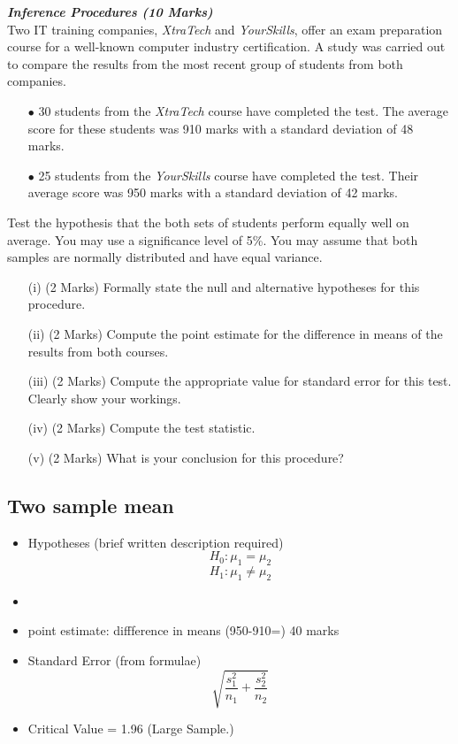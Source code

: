 
\item[(b)] \textbf{\textit{Inference Procedures (10 Marks)}}\\
Two IT training companies, \textit{XtraTech} and \textit{YourSkills}, offer an exam preparation course for a well-known computer industry certification. A study was carried out to compare the results from the most recent group of students from both companies.
\begin{itemize}
\item[$\bullet$]30 students from the \textit{XtraTech} course have completed the test. The average score for these students was 910 marks with a standard deviation of 48 marks.

\item[$\bullet$]25 students from the \textit{YourSkills} course have completed the test. Their average score was 950 marks with a standard deviation of 42 marks.
\end{itemize}

Test the hypothesis that the both sets of students perform equally well on average. You may use a significance level of 5\%. You may assume that both samples are normally distributed and have equal variance.
\begin{itemize}
\item[(i)] (2 Marks) Formally state the null and alternative hypotheses for this procedure.
\item[(ii)] (2 Marks) Compute the point estimate for the difference in means of the results from both courses.
\item[(iii)] (2 Marks) Compute the appropriate value for standard error for this test. Clearly show your workings.
\item[(iv)] (2 Marks) Compute the test statistic.
\item[(v)] (2 Marks) What is your conclusion for this procedure?
\end{itemize}


\subsection*{Two sample mean}
\begin{itemize}
\item Hypotheses (brief written description required)
\[ H_0 :  \mu_1 = \mu_2\]
\[ H_1 :  \mu_1 \neq \mu_2\]
\item 
\item point estimate:  diffference in means (950-910=) 40 marks
\item Standard Error (from formulae)
\[\sqrt{\frac{s^2_1}{n_1} + \frac{s^2_2}{n_2} }\]
\item Critical Value = 1.96 (Large Sample.)
\end{itemize}

